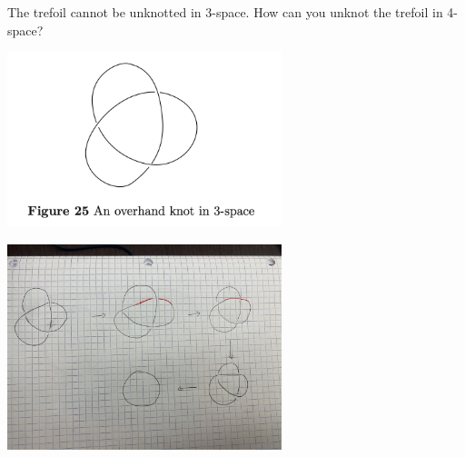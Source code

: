 \documentclass[a4paper, 11pt]{article}
\begin{document}
\begin{problem} [1.48]
The trefoil cannot be unknotted in 3-space. How can you unknot the trefoil in 4-space?
\begin{center}
    \includegraphics[width = 8cm]{figures/figure25.png}
\end{center}
\end{problem}

\begin{solution}

\mbox{}
    \begin{center}
        \includegraphics[width = 8cm]{figures/trefoilsolve.jpeg}
    \end{center}
\end{solution}
\end{document}
